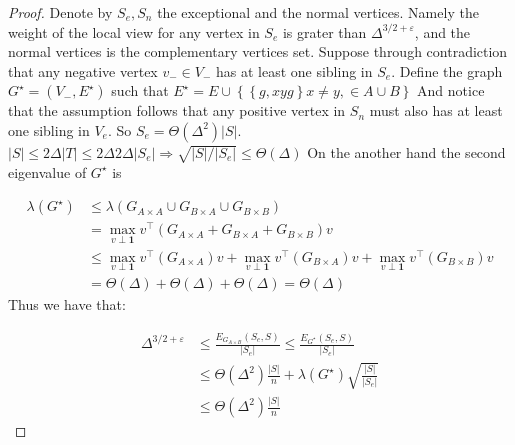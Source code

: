 \begin{proof}
  Denote by $S_{e},S_{n}$ the exceptional and the normal vertices. Namely the weight of the local view for any vertex in $S_{e}$ is grater than $\Delta^{3/2 + \varepsilon}$, and the normal vertices is the complementary vertices set. Suppose through contradiction that any negative vertex $v_{-}\in V_{-}$ has at least one sibling in $S_{e}$. Define the graph $G^{\star} = (V_{-}, E^{\star})$ such that $E^{\star} = E \cup \left\{ \left\{g, xyg \right\} x\neq y, \in A\cup B \right\}$ And notice that the assumption follows that  any positive vertex in $S_{n}$ must also has at least one sibling in $V_{e}$. So $S_{e} = \Theta\left( \Delta^{2}\right)|S|$. $|S| \le 2\Delta |T| \le  2\Delta 2\Delta |S_{e}| \Rightarrow \sqrt{|S|/|S_{e}|} \le \Theta\left( \Delta \right)$ 
  On the another hand the second eigenvalue of $G^{\star}$ is 

  \begin{equation*}
    \begin{split}
      \lambda\left( G^{\star} \right) & \le  \lambda\left( G_{A \times A} \cup G_{B \times A} \cup G_{B \times B} \right) \\
      & = \max_{v \perp \mathbf{1}} v^{\top} \left( G_{A \times A}  +  G_{B \times A} + G_{B \times B} \right) v \\
      & \le \max_{v \perp \mathbf{1}} v^{\top} \left( G_{A \times A} \right) v + \max_{v \perp \mathbf{1}} v^{\top} \left(   G_{B \times A} \right) v + \max_{v \perp \mathbf{1}} v^{\top} \left( G_{B \times B} \right) v \\ 
      & = \Theta(\Delta) + \Theta(\Delta) + \Theta(\Delta) = \Theta(\Delta) 
    \end{split}
  \end{equation*} 
  Thus we have that: 

  \begin{equation*}
    \begin{split}
      \Delta^{3/2+\varepsilon} & \le \frac{E_{G_{A\times B}}\left( S_{e},S \right)}{|S_{e}|}\le  \frac{E_{G^{\star}}\left( S_{e},S \right)}{|S_{e}|} \\
      & \le \Theta\left( \Delta^{2} \right) \frac{  |S| }{n} +  \lambda\left( G^{\star} \right) \sqrt{ \frac{ |S|}{ |S_{e}|} } \\
      & \le \Theta\left( \Delta^{2} \right) \frac{|S|}{n}   
    \end{split}
  \end{equation*}
\end{proof}

